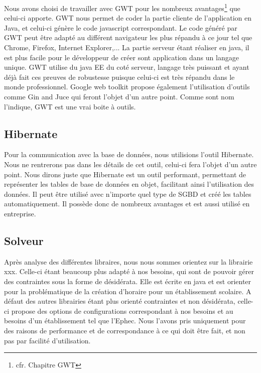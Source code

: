 Nous avons choisi de travailler avec GWT pour les nombreux avantages\footnote{cfr. Chapitre GWT} que celui-ci apporte. GWT nous permet de coder la partie cliente de l'application en Java, et celui-ci génère le code javascript correspondant. Le code généré par GWT peut être adapté au différent navigateur les plus répandu à ce jour tel que Chrome, Firefox, Internet Explorer,... La partie serveur étant réaliser en java, il est plus facile pour le développeur de créer sont application dans un langage unique. GWT utilise du java EE du coté serveur, langage très puissant et ayant déjà fait ces preuves de robustesse puisque celui-ci est très répandu dans le monde professionnel. Google web toolkit propose également l'utilisation d'outils comme Gin and Juce qui feront l'objet d'un autre point. Comme sont nom l'indique, GWT est une vrai boite à outils.

\subsection{Hibernate}
Pour la communication avec la base de données, nous utilisions l'outil Hibernate. Nous ne rentrerons pas dans les détails de cet outil, celui-ci fera l'objet d'un autre point. Nous dirons juste que Hibernate est un outil performant, permettant de représenter les tables de base de données en objet, facilitant ainsi l'utilisation des données. Il peut être utilisé avec n'importe quel type de SGBD et créé les tables automatiquement. Il possède donc de nombreux avantages et est aussi utilisé en entreprise.

\subsection{Solveur}

Après analyse des différentes libraires, nous nous sommes orientez sur la
librairie xxx. Celle-ci étant beaucoup plus adapté à nos besoins, qui sont de
pouvoir gérer des contraintes sous la forme de désidérata. Elle est écrite en java et est orienter pour la problématique de la création d'horaire pour un établissement scolaire. A défaut des autres librairies étant plus orienté contraintes et non désidérata, celle-ci propose des options de configurations correspondant à nos besoins et au besoins d'un établissement tel que l'Ephec. Nous l'avons pris uniquement pour des raisons de performance et de correspondance à ce qui doit être fait, et non pas par facilité d'utilisation.

